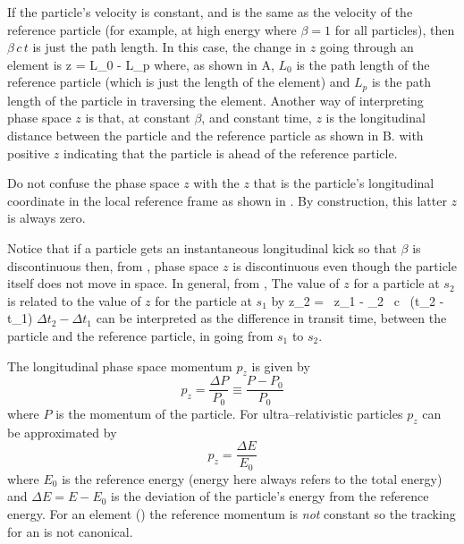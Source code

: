 If the particle's velocity is constant, and is
the same as the velocity of the reference particle (for example, at
high energy where $\beta = 1$ for all particles), then $\beta \, c \,
t$ is just the path length. In this case, the change in $z$ going
through an element is
\Begineq
  \Delta z = L_0 - L_p
\Endeq
where, as shown in A, $L_0$ is the path
length of the reference particle (which is just the length of the
element) and $L_p$ is the path length of the particle in traversing
the element.  Another way of interpreting phase space $z$ is that, at
constant $\beta$, and constant time, $z$ is the longitudinal distance
between the particle and the reference particle as shown in
B. with positive $z$ indicating that the
particle is ahead of the reference particle.

Do not confuse the phase space $z$ with the $z$ that is the particle's
longitudinal coordinate in the local reference frame as shown in
. By construction, this latter $z$ is
always zero.

Notice that if a particle gets an instantaneous longitudinal kick so
that $\beta$ is discontinuous then, from , phase space $z$ is
discontinuous even though the particle itself does not move in
space. In general, from , The value of $z$ for a particle at
$s_2$ is related to the value of $z$ for the particle at $s_1$ by
\Begineq
  z_2 =  \, z_1 - 
  \beta_2 \, c \, (\Delta t_2 - \Delta t_1)
  \label{zbbzb}
\Endeq
$\Delta t_2 - \Delta t_1$ can be interpreted as the difference in
transit time, between the particle and the reference particle, in going
from $s_1$ to $s_2$.

The longitudinal phase space momentum $p_z$ is given by
\begin{equation}
  p_z = \frac{\Delta P}{P_0} \equiv \frac{P - P_0}{P_0}
\end{equation}
where $P$ is the momentum of the particle. For ultra--relativistic particles
$p_z$ can be approximated by
\begin{equation}
  p_z = \frac{\Delta E}{E_0}
\end{equation}
where $E_0$ is the reference energy (energy here always refers to the
total energy) and $\Delta E = E - E_0$ is the deviation of the
particle's energy from the reference energy. For an 
element () the reference momentum is {\it not} constant
so the tracking for an  is not canonical.

